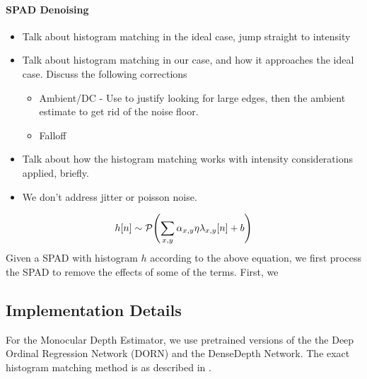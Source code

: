 \paragraph{SPAD Denoising}
\begin{itemize}
  \item Talk about histogram matching in the ideal case, jump straight to intensity 
  \item Talk about histogram matching in our case, and how it approaches the
    ideal case. Discuss the following corrections 
    \begin{itemize}
      \item Ambient/DC - Use \cite{Xin2019} to justify looking for large edges,
        then the ambient estimate to get rid of the noise floor.
      \item Falloff
    \end{itemize}
  \item Talk about how the histogram matching works with intensity
    considerations applied, briefly.
  \item We don't address jitter or poisson noise.
\end{itemize}
\begin{equation}
  h[n] \sim \mathcal{P}\paren*{\sum_{x,y}\alpha_{x,y}\eta \lambda_{x,y}[n] + b} \label{global_hints}
\end{equation}
Given a SPAD with histogram $h$ according to the above equation, we first
process the SPAD to remove the effects of some of the terms. First, we 
\subsection{Implementation Details}
For the Monocular Depth Estimator, we use pretrained versions of the
the Deep Ordinal Regression Network (DORN) \cite{} and the DenseDepth Network.
The exact histogram matching method is as described in \cite{}.


